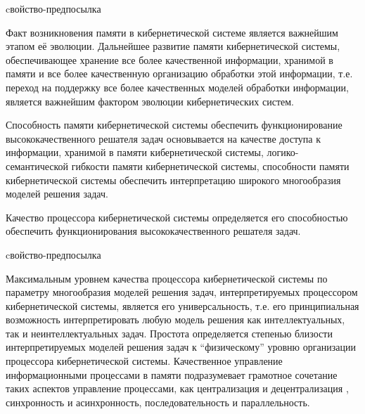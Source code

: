 \begin{SCn}
\begin{scnrelfromlist}{cвойство-предпосылка}
\end{scnrelfromlist}
\end{SCn}

Факт возникновения памяти в кибернетической системе является важнейшим этапом её эволюции.
Дальнейшее развитие памяти кибернетической системы, обеспечивающее хранение все более качественной информации, хранимой в памяти и все более качественную организацию обработки этой информации, т.е. переход на поддержку все более качественных моделей обработки информации, является важнейшим фактором эволюции кибернетических систем.

Способность памяти кибернетической системы обеспечить функционирование высококачественного решателя задач основывается на качестве доступа к информации, хранимой в памяти кибернетической системы, логико-семантической гибкости памяти кибернетической системы, способности памяти кибернетической системы обеспечить интерпретацию широкого многообразия моделей решения задач.

Качество процессора кибернетической системы определяется его способностью обеспечить функционирования высококачественного решателя задач.

\begin{SCn}
\begin{scnrelfromlist}{cвойство-предпосылка}
\end{scnrelfromlist}
\end{SCn}

Максимальным уровнем качества процессора кибернетической системы по параметру многообразия моделей решения задач, интерпретируемых процессором кибернетической системы, является его универсальность, т.е. его принципиальная возможность интерпретировать любую модель решения как интеллектуальных, так и неинтеллектуальных задач. 
Простота определяется степенью близости интерпретируемых моделей решения задач к “физическому” уровню организации процессора кибернетической системы. 
Качественное управление информационными процессами в памяти подразумевает грамотное сочетание таких аспектов управление процессами, как централизация и децентрализация \cite{melekhova2018decentralised}, синхронность и асинхронность, последовательность и параллельность.

